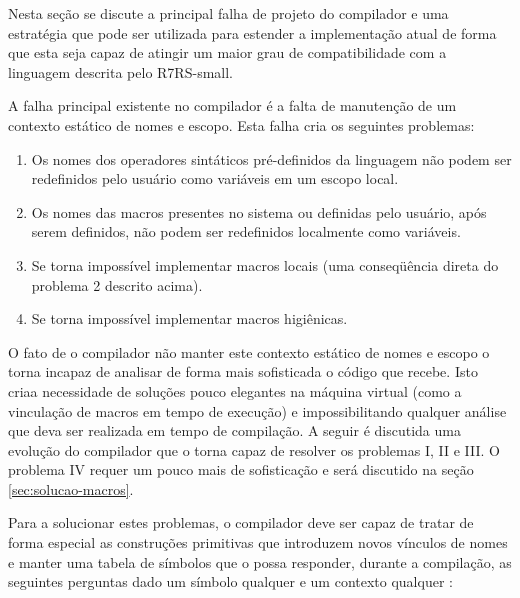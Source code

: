 Nesta seção se discute a principal falha de projeto do compilador e uma
estratégia que pode ser utilizada para estender a implementação atual de forma
que esta seja capaz de atingir um maior grau de compatibilidade com a linguagem
descrita pelo \acs{R7RS}-small.

A falha principal existente no compilador é a falta de manutenção de um
contexto estático de nomes e escopo. Esta falha cria os seguintes problemas:

\begin{enumerate}[I]

 \item Os nomes dos operadores sintáticos pré-definidos da linguagem não podem
ser redefinidos pelo usuário como variáveis em um escopo local.

 \item Os nomes das macros presentes no sistema ou definidas pelo usuário, após
serem definidos, não podem ser redefinidos localmente como variáveis.

 \item Se torna impossível implementar macros locais (uma conseqüência direta
do problema 2 descrito acima).
 
 \item Se torna impossível implementar macros higiênicas.

\end{enumerate}


O fato de o compilador não manter este contexto estático de nomes e escopo o
torna incapaz de analisar de forma mais sofisticada o código que recebe.
Isto criaa necessidade de soluções pouco elegantes na máquina virtual (como a
vinculação de macros em tempo de execução) e impossibilitando qualquer análise
que deva ser realizada em tempo de compilação. A seguir é
discutida uma evolução do compilador que o torna capaz de resolver os problemas
I, II e III. O problema IV requer um pouco mais de sofisticação e será
discutido na seção \ref{sec:solucao-macros}.

Para a solucionar estes problemas, o compilador deve ser capaz de tratar de
forma especial as construções primitivas que introduzem novos vínculos de nomes
e manter uma tabela de símbolos que o possa responder, durante a compilação,
as seguintes perguntas dado um símbolo qualquer  e um
contexto qualquer :

